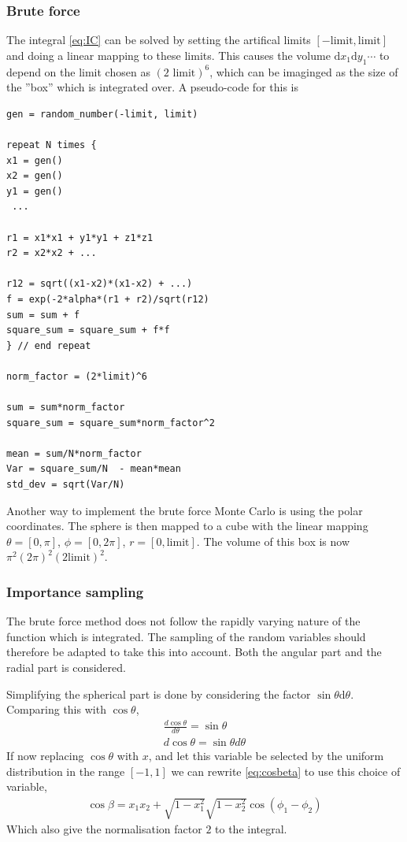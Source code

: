 \documentclass[11pt,a4paper,english,final]{article}
\numberwithin{equation}{section}
\newcommand{\di}{\mathrm{d}}
\begin{document}
\subsubsection{Brute force}

The integral \eqref{eq:IC} can be solved by setting the artifical limits 
$[-\mathrm{limit}, \mathrm{limit}]$ and doing a linear mapping to these limits.
This causes the volume $\di x_1 \di y_1 \cdots$ to depend on the 
limit chosen as $(2\text{ limit})^6$, which can be imaginged as the size
of the ''box'' which is integrated over. A pseudo-code for this is
\begin{lstlisting}
gen = random_number(-limit, limit)

repeat N times {
x1 = gen()
x2 = gen()
y1 = gen()
 ...

r1 = x1*x1 + y1*y1 + z1*z1
r2 = x2*x2 + ...

r12 = sqrt((x1-x2)*(x1-x2) + ...)
f = exp(-2*alpha*(r1 + r2)/sqrt(r12)
sum = sum + f
square_sum = square_sum + f*f
} // end repeat

norm_factor = (2*limit)^6

sum = sum*norm_factor
square_sum = square_sum*norm_factor^2

mean = sum/N*norm_factor
Var = square_sum/N  - mean*mean
std_dev = sqrt(Var/N)
\end{lstlisting}

Another way to implement the brute force Monte Carlo is using the 
polar coordinates. The sphere is then mapped to a cube with the 
linear mapping 
$\theta = [0, \pi]$, $\phi = [0, 2\pi]$, $r = [0,\mathrm{limit}]$. 
The volume of this box is now $\pi^2(2\pi)^2(2\mathrm{limit})^2$.

\subsubsection{Importance sampling}

The brute force method does not follow the rapidly varying nature of 
the function which is integrated. The sampling of the random variables 
should therefore be adapted to take this into account. Both the 
angular part and the radial part is considered.

Simplifying the spherical part is done by considering the factor 
$\sin\theta \di\theta$. Comparing this with $\cos \theta$,
\begin{gather}
\frac{d\cos \theta}{d\theta} = \sin\theta\\
d\cos\theta = \sin \theta d\theta
\end{gather}
If now replacing $\cos \theta$ with $x$, and let this variable be selected 
by the uniform distribution in the range $[-1,1]$ we can rewrite 
\eqref{eq:cosbeta} to use this choice of variable,
\begin{gather}
\cos\beta = x_1 x_2 + \sqrt{1-x_1^2}\sqrt{1-x_2^2}\cos(\phi_1-\phi_2)
\end{gather}
Which also give the normalisation factor $2$ to the integral.
\end{document}
